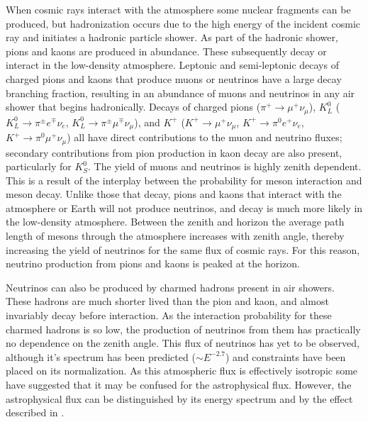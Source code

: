 When cosmic rays interact with the atmosphere some nuclear fragments can be produced, but hadronization occurs due to the high energy of the incident cosmic ray and initiates a hadronic particle shower.
As part of the hadronic shower, pions and kaons are produced in abundance.
These subsequently decay or interact in the low-density atmosphere.
Leptonic and semi-leptonic decays of charged pions and kaons that produce muons or neutrinos have a large decay branching fraction, resulting in an abundance of muons and neutrinos in any air shower that begins hadronically.
Decays of charged pions
($\pi^+\rightarrow\mu^+\nu_\mu$), 
$K_L^0$ ($K_L^0 \rightarrow \pi^\pm e^\mp \nu_e$, $K_L^0 \rightarrow \pi^\pm \mu^\mp \nu_\mu$), and 
$K^+$ ($K^+\rightarrow \mu^+ \nu_\mu$, $K^+\rightarrow \pi^0 e^+ \nu_e$, $K^+\rightarrow \pi^0 \mu^+ \nu_\mu$) 
all have direct contributions to the muon and neutrino fluxes; secondary contributions from pion production in kaon decay are also present, particularly for $K_S^0$.
The yield of muons and neutrinos is highly zenith dependent.
This is a result of the interplay between the probability for meson interaction and meson decay.
Unlike those that decay, pions and kaons that interact with the atmosphere or Earth will not produce neutrinos, and decay is much more likely in the low-density atmosphere.
Between the zenith and horizon the average path length of mesons through the atmosphere increases with zenith angle, thereby increasing the yield of neutrinos for the same flux of cosmic rays.
For this reason, neutrino production from pions and kaons is peaked at the horizon.

Neutrinos can also be produced by charmed hadrons present in air showers.
These hadrons are much shorter lived than the pion and kaon, and almost invariably decay before interaction.
As the interaction probability for these charmed hadrons is so low, the production of neutrinos from them has practically no dependence on the zenith angle.
This flux of neutrinos has yet to be observed, although it's spectrum has been predicted ($\sim E^{-2.7}$) and constraints have been placed on its normalization.
As this atmospheric flux is effectively isotropic some have suggested that it may be confused for the astrophysical flux.
However, the astrophysical flux can be distinguished by its energy spectrum and by the effect described in .

